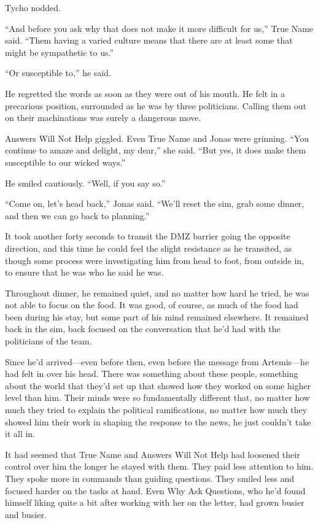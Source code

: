 Tycho nodded.

``And before you ask why that does not make it more difficult for us,'' True Name said. ``Them having a varied culture means that there are at least some that might be sympathetic to us.''

``Or susceptible to,'' he said.

He regretted the words as soon as they were out of his mouth. He felt in a precarious position, surrounded as he was by three politicians. Calling them out on their machinations was surely a dangerous move.

Answers Will Not Help giggled. Even True Name and Jonas were grinning. ``You continue to amaze and delight, my dear,'' she said. ``But yes, it does make them susceptible to our wicked ways.''

He smiled cautiously. ``Well, if you say so.''

``Come on, let's head back,'' Jonas said. ``We'll reset the sim, grab some dinner, and then we can go back to planning.''

It took another forty seconds to transit the DMZ barrier going the opposite direction, and this time he could feel the slight resistance as he transited, as though some process were investigating him from head to foot, from outside in, to ensure that he was who he said he was.

Throughout dinner, he remained quiet, and no matter how hard he tried, he was not able to focus on the food. It was good, of course, as much of the food had been during his stay, but some part of his mind remained elsewhere. It remained back in the sim, back focused on the conversation that he'd had with the politicians of the team.

Since he'd arrived—even before then, even before the message from Artemis—he had felt in over his head. There was something about these people, something about the world that they'd set up that showed how they worked on some higher level than him. Their minds were so fundamentally different that, no matter how much they tried to explain the political ramifications, no matter how much they showed him their work in shaping the response to the news, he just couldn't take it all in.

It had seemed that True Name and Answers Will Not Help had loosened their control over him the longer he stayed with them. They paid less attention to him. They spoke more in commands than guiding questions. They smiled less and focused harder on the tasks at hand. Even Why Ask Questions, who he'd found himself liking quite a bit after working with her on the letter, had grown busier and busier.

